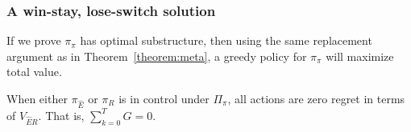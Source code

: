 \subsubsection*{A win-stay, lose-switch solution}
If we prove $\pi_{\pi}$ has optimal substructure, then using the same replacement argument \cite{Roughgarden2019} as in Theorem~\ref{theorem:meta}, a greedy policy for $\pi_\pi$ will maximize total value.

\begin{theorem}
	\label{th:no_regret_ER}
	When either $\pi_{\hat E}$ or $\pi_R$ is in control under $\Pi_{\pi}$, all actions are zero regret in terms of $V_{\hat{E}R}$. That is, $\sum_{k=0}^{T} G = 0$.
\end{theorem}


    
    
	
	
